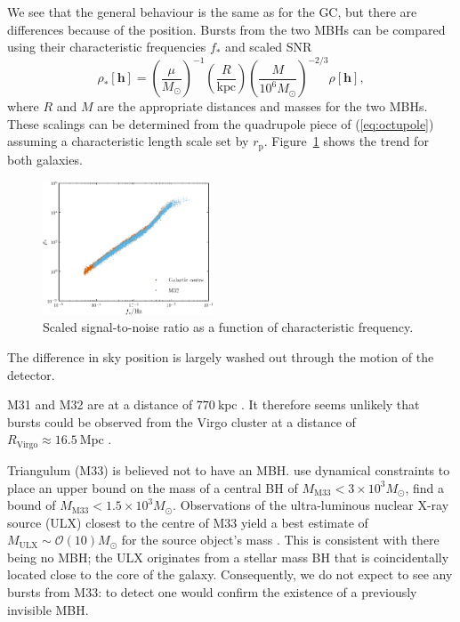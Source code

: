\documentclass[useAMS,usedcolumn,usegraphicx,usenatbib]{mn2e}
\newcommand{\eqnref}[1]{(\ref{eq:#1})}
\newcommand{\Figref}[1]{Figure~\ref{fig:#1}}
\newcommand{\units}[1]{\ensuremath{~\mathrm{#1}}}
\newcommand{\sub}[1]{\ensuremath{_\mathrm{#1}}}
\newcommand{\order}[1]{\ensuremath{\mathcal{O}({#1})}}
\begin{document}
We see that the general behaviour is the same as for the GC, but there are differences because of the position. Bursts from the two MBHs can be compared using their characteristic frequencies $f_\ast$ and scaled SNR
\begin{equation}
\rho_\ast[\boldsymbol{h}] = \left(\frac{\mu}{M_\odot}\right)^{-1}\left(\frac{R}{\mathrm{kpc}}\right)\left(\frac{M}{10^6 M_\odot}\right)^{-2/3}\rho[\boldsymbol{h}],
\end{equation}
where $R$ and $M$ are the appropriate distances and masses for the two MBHs. These scalings can be determined from the quadrupole piece of \eqnref{octupole} assuming a characteristic length scale set by $r\sub{p}$. \Figref{SNR-scaling} shows the trend for both galaxies.
\begin{figure}
  \begin{center}
  \includegraphics[width=0.45\textwidth]{Fig_SNR_scaled}
    \caption{Scaled signal-to-noise ratio as a function of characteristic frequency.\label{fig:SNR-scaling}}
  \end{center}
\end{figure}
The difference in sky position is largely washed out through the motion of the detector.

M31 and M32 are at a distance of $770\units{kpc}$ \citep{Karachentsev2004}. It therefore seems unlikely that bursts could be observed from the Virgo cluster at a distance of $R\sub{Virgo} \approx 16.5\units{Mpc}$ \citep{Mei2007}.

Triangulum (M33) is believed not to have an MBH. \citet{Merritt2001} use dynamical constraints to place an upper bound on the mass of a central BH of $M\sub{M33} < 3 \times 10^3 M_\odot$, \citet{Gebhardt2001} find a bound of $M\sub{M33} < 1.5 \times 10^3 M_\odot$. Observations of the ultra-luminous nuclear X-ray source (ULX) closest to the centre of M33 yield a best estimate of $M\sub{ULX} \sim \order{10} M_\odot$ for the source object's mass \citep{Foschini2004, Weng2009}. This is consistent with there being no MBH; the ULX originates from a stellar mass BH that is coincidentally located close to the core of the galaxy. Consequently, we do not expect to see any bursts from M33: to detect one would confirm the existence of a previously invisible MBH.
\end{document}
